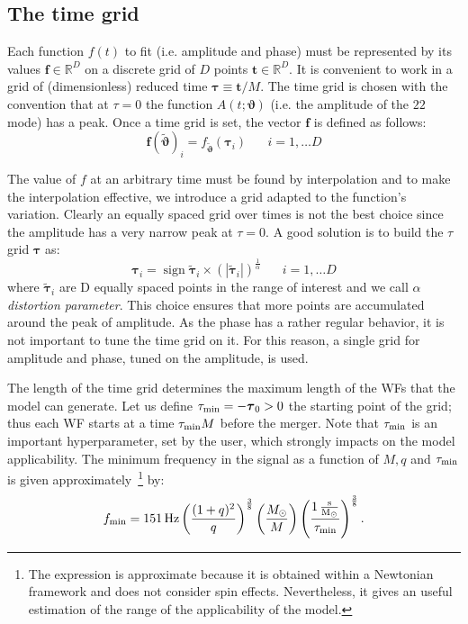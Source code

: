 \documentclass[twocolumn,showpacs,preprintnumbers,nofootinbib,prd,
superscriptaddress,10pt]{revtex4-1}
\newcommand{\R}{\mathbb{R}}
\DeclareMathOperator{\sign}{sign}
\begin{document}
\subsection{The time grid}
Each function $f(t)$ to fit (i.e. amplitude and phase) must be represented by its values $\mathbf{f} \in \R^D$ on a discrete grid of $D$ points $\mathbf{t} \in \R^D$.
It is convenient to work in a grid of (dimensionless) reduced time $\boldsymbol{\tau} \equiv \mathbf{t}/M$.
The time grid is chosen with the convention that at $\tau=0$ the function $A(t;\boldsymbol{\vartheta})$ (i.e. the amplitude of the ${22}$ mode) has a peak.
Once a time grid is set, the vector $\mathbf{f}$ is defined as follows:
\begin{equation}
	\mathbf{f}({\tilde{\boldsymbol{\vartheta}}})_i = f_{{\tilde{\boldsymbol{\vartheta}}}}(\boldsymbol{\tau}_i) \;\;\;\;\;\; i = 1, \ldots D
\end{equation}

The value of $f$ at an arbitrary time must be found by interpolation and to make the interpolation effective,
we introduce a grid adapted to the function's variation.
Clearly an equally spaced grid over times is not the best choice since the amplitude has a very narrow peak at $\tau=0$.
A good solution is to build the $\tau$ grid ${\boldsymbol{\tau}}$ as:
\begin{equation} \label{eq:tau_grid}
	{\boldsymbol{\tau}}_i = \sign{\boldsymbol{\tilde{\tau}}_i} \times (|\boldsymbol{\tilde{\tau}}_i|)^{\frac{1}{\alpha}} \;\;\;\;\;\; i = 1, \ldots D
\end{equation}
where $\boldsymbol{\tilde{\tau}}_i$ are D equally spaced points in the range of interest and we call $\alpha$ \textit{distortion parameter}.
This choice ensures that more points are accumulated around the peak of amplitude.
As the phase has a rather regular behavior, it is not important to tune the time grid on it. For this reason, a single grid for amplitude and phase, tuned on the amplitude, is used.

The length of the time grid determines the maximum length of the WFs that the model can generate.
Let us define $\tau_{\rm min} = -{\boldsymbol{\tau}}_0 > 0 $ the starting point of the grid; thus each WF starts 
at a time $\tau_{\rm min} M$ before the merger. Note that $\tau_{\rm min}$ is an important hyperparameter, 
set by the user, which strongly impacts on the model applicability.
The minimum frequency in the signal as a function of $M, q$ and $\tau_{\rm min}$ is given 
approximately~\footnote{The expression is approximate because it is obtained within a Newtonian framework and does not consider spin effects.
Nevertheless, it gives an useful estimation of the range of the applicability of the model.}
by:
\begin{align}\label{eq:f_min}
	f_{\rm min} = \SI{151}{Hz}  \left( \frac{(1+q)^2}{q} \right)^{\frac{3}{8}}  \left( \frac{M_\odot}{M} \right)  \left(\frac{\SI{1}{ \frac{s}{M_\odot}}}{\tau_{\rm min}} \right)^{\frac{3}{8}} .
\end{align} 
\end{document}

